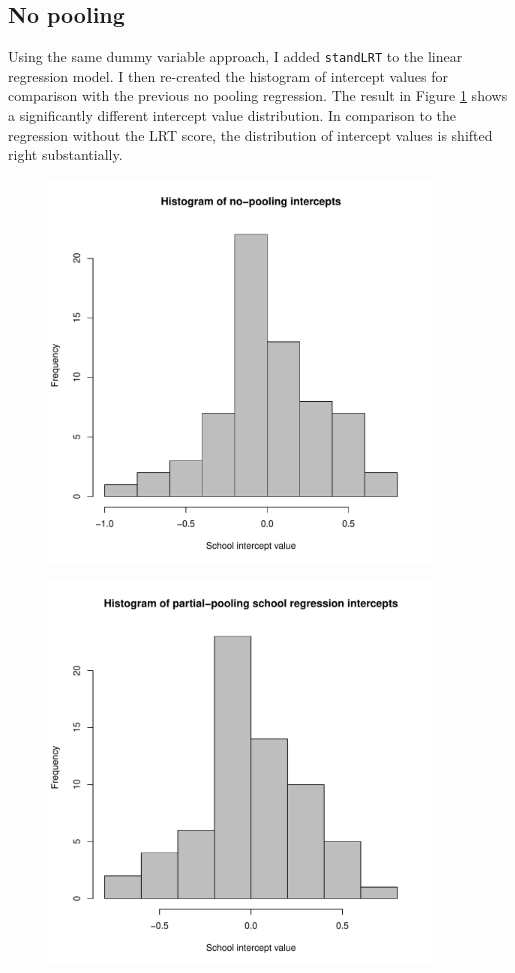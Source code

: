 \documentclass{article}
\begin{document}
\subsection{No pooling}
Using the same dummy variable approach, I added \verb|standLRT| to the linear regression model. I then re-created the histogram of intercept values for comparison with the previous no pooling regression. The result in Figure \ref{LRT no pooling} shows a significantly different intercept value distribution. In comparison to the regression without the LRT score, the distribution of intercept values is shifted right substantially.

\begin{figure}[H]
\centering
\includegraphics[width = 4in]{figures/no_pooling_LRT.pdf}
\caption{}
\label{LRT no pooling}
\end{figure}

\begin{figure}[H]
\centering
\includegraphics[width = 4in]{figures/partial_pooling_LRT.pdf}
\caption{}
\label{LRT partial}
\end{figure}
\end{document}
